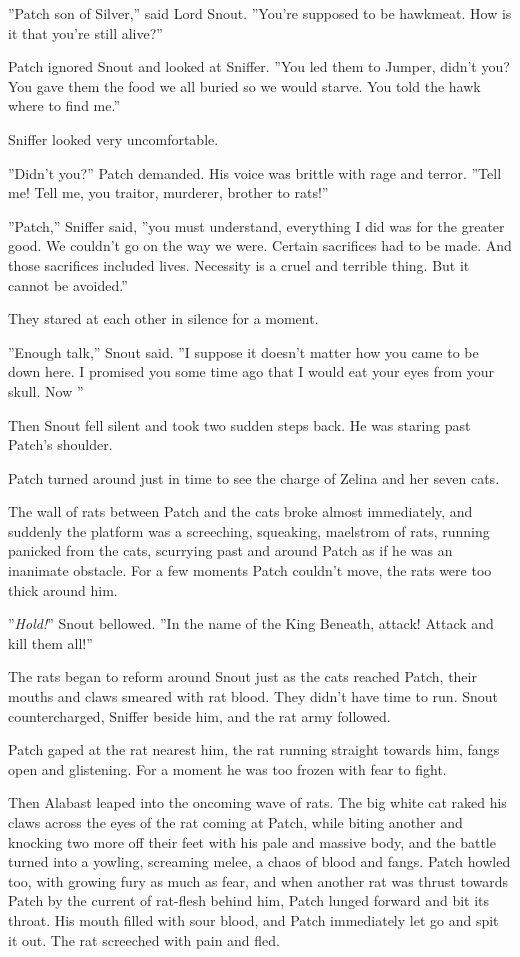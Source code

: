 \documentclass[12pt]{book}
\begin{document}
''Patch son of Silver,'' said Lord Snout. ''You're supposed to be hawkmeat. How is it that you're still alive?''

Patch ignored Snout and looked at Sniffer. ''You led them to Jumper, didn't you? You gave them the food we all buried so we would starve. You told the hawk where to find me.''

Sniffer looked very uncomfortable.

''Didn't you?'' Patch demanded. His voice was brittle with rage and terror. ''Tell me! Tell me, you traitor, murderer, brother to rats!''

''Patch,'' Sniffer said, ''you must understand, everything I did was for the greater good. We couldn't go on the way we were. Certain sacrifices had to be made. And those sacrifices included lives. Necessity is a cruel and terrible thing. But it cannot be avoided.''

They stared at each other in silence for a moment.

''Enough talk,'' Snout said. ''I suppose it doesn't matter how you came to be down here. I promised you some time ago that I would eat your eyes from your skull. Now %
''

Then Snout fell silent and took two sudden steps back. He was staring past Patch's shoulder.

Patch turned around just in time to see the charge of Zelina and her seven cats.

The wall of rats between Patch and the cats broke almost immediately, and suddenly the platform was a screeching, squeaking, maelstrom of rats, running panicked from the cats, scurrying past and around Patch as if he was an inanimate obstacle. For a few moments Patch couldn't move, the rats were too thick around him.

''{\it Hold!}'' Snout bellowed. ''In the name of the King Beneath, attack! Attack and kill them all!''

The rats began to reform around Snout just as the cats reached Patch, their mouths and claws smeared with rat blood. They didn't have time to run. Snout countercharged, Sniffer beside him, and the rat army followed.

Patch gaped at the rat nearest him, the rat running straight towards him, fangs open and glistening. For a moment he was too frozen with fear to fight.

Then Alabast leaped into the oncoming wave of rats. The big white cat raked his claws across the eyes of the rat coming at Patch, while biting another and knocking two more off their feet with his pale and massive body, and the battle turned into a yowling, screaming melee, a chaos of blood and fangs. Patch howled too, with growing fury as much as fear, and when another rat was thrust towards Patch by the current of rat-flesh behind him, Patch lunged forward and bit its throat. His mouth filled with sour blood, and Patch immediately let go and spit it out. The rat screeched with pain and fled.
\end{document}
